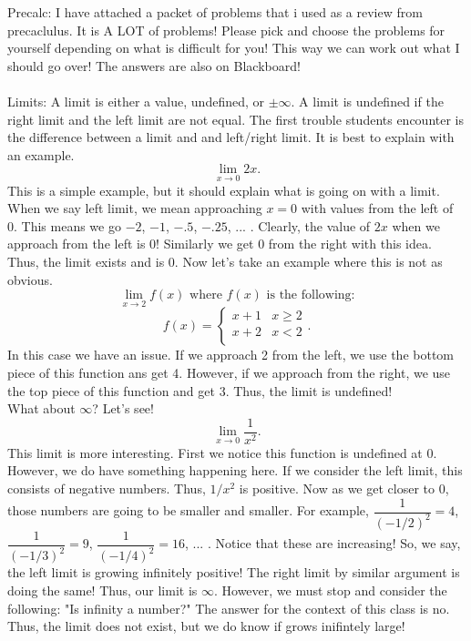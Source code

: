 \documentclass[10pt]{article}
\theoremstyle{Theorem}
\theoremstyle{definition}
\theoremstyle{remark}
\theoremstyle{custom}
\begin{document}
\thispagestyle{firststyle}
\pagestyle{plain}

Precalc: I have attached a packet of problems that i used as a review from precaclulus. It is A LOT of problems! Please pick and choose the problems for yourself depending on what is difficult for you! This way we can work out what I should go over! The answers are also on Blackboard!\\\\
Limits: A limit is either a value, undefined, or $\pm \infty$.  A limit is undefined if the right limit and the left limit are not equal. The first trouble students encounter is the difference between a limit and and left/right limit. It is best to explain with an example. 
$$\lim_{x\rightarrow 0} 2x.$$
This is a simple example, but it should explain what is going on with a limit.  When we say left limit, we mean approaching $x=0$ with values from the left of 0. This means we go $-2$, $-1$, $-.5$, $-.25$, ...  . Clearly, the value of $2x$ when we approach from the left is 0! Similarly we get 0 from the right with this idea. Thus, the limit exists and is 0.  Now let's take an example where this is not as obvious.
$$\lim_{x\rightarrow 2} f(x) \text{ where } f(x) \text{ is the following:}$$
$$f(x)=\begin{cases} 
      x+1 & x\geq 2 \\
      x+2 & x<2 \\
   \end{cases}.$$
In this case we have an issue. If we approach 2 from the left, we use the bottom piece of this function ans get 4. However, if we approach from the right, we use the top piece of this function and get 3. Thus, the limit is undefined!\\
What about $\infty$? Let's see! 
$$\lim_{x\rightarrow 0} \dfrac{1}{x^2}.$$
This limit is more interesting. First we notice this function is undefined at 0. However, we do have something happening here. If we consider the left limit, this consists of negative numbers. Thus, $1/x^2$ is positive. Now as we get closer to 0, those numbers are going to be smaller and smaller. For example, $\dfrac{1}{(-1/2)^2}=4$, $\dfrac{1}{(-1/3)^2}=9$, $\dfrac{1}{(-1/4)^2}=16$, ... . Notice that these are increasing! So, we say, the left limit is growing infinitely positive! The right limit by similar argument is doing the same! Thus, our limit is $\infty$.  However, we must stop and consider the following: "Is infinity a number?"  The answer for the context of this class is no. Thus, the limit does not exist, but we do know if grows inifintely large!\\
\end{document}
